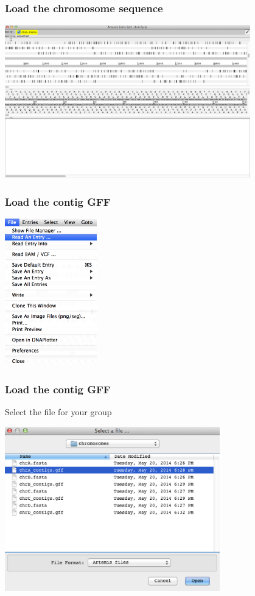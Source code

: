 \documentclass[table]{beamer}
\begin{document}
  \begin{frame}
    \frametitle{Load the chromosome sequence}
    \begin{center}
      \includegraphics[width=0.8\textwidth]{images/artemis_loaded_seq} 
    \end{center}
\end{frame}

  \begin{frame}
    \frametitle{Load the contig GFF}
    \begin{center}
      \includegraphics[width=0.3\textwidth]{images/artemis_read_entry} 
    \end{center}
\end{frame}

  \begin{frame}
    \frametitle{Load the contig GFF}
    Select the file for your group
    \begin{center}
      \includegraphics[width=0.7\textwidth]{images/artemis_select_contig_gff} 
    \end{center}
\end{frame}
\end{document}
